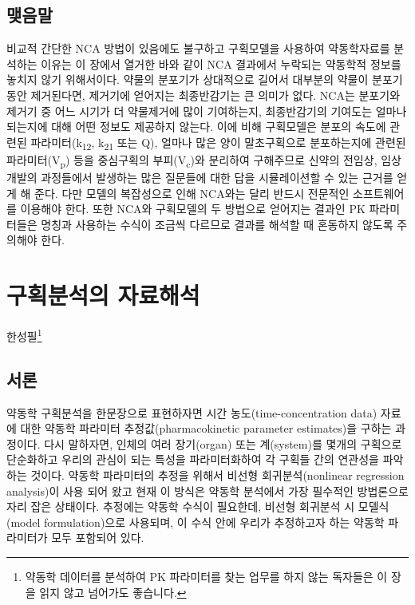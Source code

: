\documentclass[
  11pt,
  krantz2, a4paper, twoside]{krantz}
\theoremstyle{definition}
\theoremstyle{definition}
\theoremstyle{definition}
\theoremstyle{definition}
\theoremstyle{remark}
\begin{document}
\hypertarget{uxb9fauxc74cuxb9d0-3}{%
\section{맺음말}\label{uxb9fauxc74cuxb9d0-3}}

비교적 간단한 NCA 방법이 있음에도 불구하고 구획모델을 사용하여
약동학자료를 분석하는 이유는 이 장에서 열거한 바와 같이 NCA 결과에서 누락되는 약동학적 정보를 놓치지 않기 위해서이다.
약물의 분포기가 상대적으로 길어서 대부분의 약물이 분포기동안 제거된다면, 제거기에 얻어지는 최종반감기는 큰 의미가 없다. 
NCA는 분포기와 제거기 중 어느 시기가 더 약물제거에 많이 기여하는지, 최종반감기의 기여도는 얼마나 되는지에 대해
어떤 정보도 제공하지 않는다.
이에 비해 구획모델은 분포의 속도에 관련된 파라미터(k\textsubscript{12}, k\textsubscript{21} 또는 Q), 얼마나 많은 양이 말초구획으로
분포하는지에 관련된 파라미터(V\textsubscript{p}) 등을 중심구획의 부피(V\textsubscript{c})와 분리하여
구해주므로 신약의 전임상, 임상개발의 과정들에서 발생하는 많은 질문들에
대한 답을 시뮬레이션할 수 있는 근거를 얻게 해 준다. 다만 모델의
복잡성으로 인해 NCA와는 달리 반드시 전문적인 소프트웨어를 이용해야 한다.
또한 NCA와 구획모델의 두 방법으로 얻어지는 결과인 PK 파라미터들은 명칭과
사용하는 수식이 조금씩 다르므로 결과를 해석할 때 혼동하지
않도록 주의해야 한다.

\hypertarget{ca-analysis}{%
\chapter{구획분석의 자료해석}\label{ca-analysis}}

\Large\hfill

한성필\footnote{약동학 데이터를 분석하여 PK 파라미터를 찾는 업무를 하지 않는 독자들은 이 장을 읽지 않고 넘어가도 좋습니다.}
\normalsize

\hypertarget{uxc11cuxb860-3}{%
\section{서론}\label{uxc11cuxb860-3}}

약동학 구획분석을 한문장으로 표현하자면 시간 농도(time-concentration data) 자료에 대한 약동학 파라미터 추정값(pharmacokinetic parameter estimates)을 구하는 과정이다. 
다시 말하자면, 인체의 여러 장기(organ) 또는 계(system)를 몇개의 구획으로 단순화하고 우리의 관심이 되는 특성을 파라미터화하여 각 구획들 간의 연관성을 파악하는 것이다.
약동학 파라미터의 추정을 위해서 비선형 회귀분석(nonlinear regression analysis)이 사용 되어 왔고 현재 이 방식은 약동학 분석에서 가장 필수적인 방법론으로 자리 잡은 상태이다. 
추정에는 약동학 수식이 필요한데, 비선형 회귀분석 시 모델식(model formulation)으로 사용되며, 이 수식 안에 우리가 추정하고자 하는 약동학 파라미터가 모두 포함되어 있다. 
\end{document}
